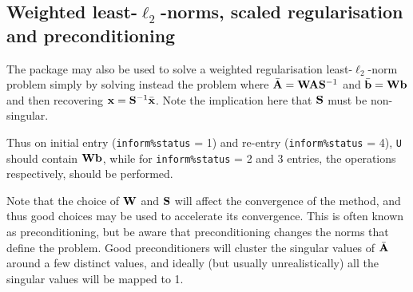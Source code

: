 \documentclass{galahad}
\newcommand{\packagename}{L2\-RT}
\begin{document}

\subsection{Weighted least-$\ell_2$-norms, scaled regularisation and
preconditioning}
The package may also be used to solve a weighted regularisation
least-$\ell_2$-norm problem
simply by solving instead the problem
where $\bar{{\mathbf{A}}} = {\mathbf{W}} {\mathbf{A}} {\mathbf{S}}^{-1}$ and
$\bar{{\mathbf{b}}} = {\mathbf{W}} {\mathbf{b}}$
and then recovering ${\mathbf{x}} = {\mathbf{S}}^{-1} \bar{{\mathbf{x}}}$. Note the implication here
that ${\mathbf{S}}$ must be non-singular.

Thus on initial entry ({\tt inform\%status} = 1) and re-entry
({\tt inform\%status} = 4), {\tt U} should contain ${\mathbf{W}} {\mathbf{b}}$,
while for {\tt inform\%status} = 2 and 3 entries, the operations
respectively, should be performed.

Note that the choice of ${\mathbf{W}}$ and ${\mathbf{S}}$ will affect the convergence of the
method, and thus good choices may be used to accelerate its convergence. This
is often known as preconditioning, but be aware that preconditioning changes
the norms that define the problem. Good preconditioners will cluster
the singular values of $\bar{{\mathbf{A}}}$ around a few distinct values, and ideally
(but usually unrealistically) all the singular values will be mapped to 1.


\end{document}
